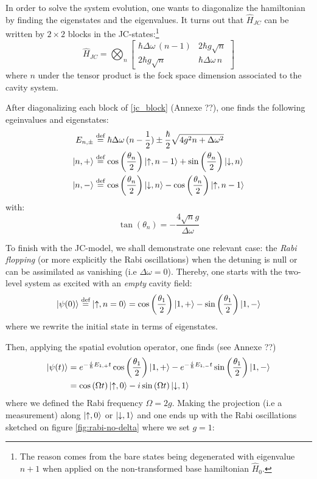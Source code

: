 \documentclass[12pt]{report}
\DeclarePairedDelimiter\ket{\lvert}{\rangle}
\begin{document}
In order to solve the system evolution, one wants to diagonalize the hamiltonian by finding the eigenstates and the eigenvalues. It turns out that $\hat{H}_{JC}$ can be written by $2\times 2$ blocks in the JC-states:\footnote{The reason comes from the bare states being degenerated with eigenvalue $n+1$ when applied on the non-transformed base hamiltonian $\hat{H}_0$.}
\begin{equation}
\label{jc_block}
\hat{H}_{JC} = \bigotimes_n \begin{bmatrix}
\hbar \Delta\omega \, (n-1) & 2\hbar g \sqrt{n}\\
2\hbar g \sqrt{n} & \hbar \Delta\omega \, n
\end{bmatrix}
\end{equation}
where $n$ under the tensor product is the fock space dimension associated to the cavity system.

After diagonalizing each block of \eqref{jc_block} (Annexe ??), one finds the following egeinvalues and eigenstates:
\begin{align}
E_{n, \pm} &\stackrel{\text{def}}{=} \hbar\Delta\omega\,(n-\frac{1}{2}) \pm \frac{\hbar}{2}\sqrt{4g^2n + \Delta\omega ^2}\\
\ket{n, +} &\stackrel{\text{def}}{=} \cos\left(\frac{\theta_n}{2}\right) \ket{\uparrow, n - 1}  + \sin\left(\frac{\theta_n}{2}\right) \ket{\downarrow, n}\\
\ket{n, -} &\stackrel{\text{def}}{=} \cos\left(\frac{\theta_n}{2}\right) \ket{\downarrow, n}  - \cos\left(\frac{\theta_n}{2}\right) \ket{\uparrow, n - 1}
\end{align}
with:
\begin{equation}
\label{tan_theta_n}
\tan\left(\theta_n\right) = -\frac{4\sqrt{n}g}{\Delta\omega}
\end{equation}

To finish with the JC-model, we shall demonstrate one relevant case: the \textit{Rabi flopping} (or more explicitly the Rabi oscillations) when the detuning is null or can be assimilated as vanishing (i.e $\Delta\omega = 0$). Thereby, one starts with the two-level system as excited with an \textit{empty} cavity field:
\begin{equation}
\ket{\psi(0)} \stackrel{\text{def}}{=} \ket{\uparrow, n = 0} = \cos\left(\frac{\theta_{1}}{2}\right) \ket{1, +} - \sin\left(\frac{\theta_{1}}{2}\right) \ket{1, -}
\end{equation}
where we rewrite the initial state in terms of eigenstates.

Then, applying the spatial evolution operator, one finds (see Annexe ??)
\begin{align}
\ket{\psi(t)} &= e^{-\frac{i}{\hbar}E_{1,+}t} \cos\left(\frac{\theta_{1}}{2}\right) \ket{1, +} - e^{-\frac{i}{\hbar}E_{1,-}t} \sin\left(\frac{\theta_{1}}{2}\right) \ket{1, -}\\
&= \cos\left(\Omega t\right) \ket{\uparrow, 0} - i \sin\left(\Omega t\right) \ket{\downarrow, 1}
\end{align}
where we defined the Rabi frequency $\Omega = 2g$. Making the projection (i.e a measurement) along $\ket{\uparrow, 0}$ or $\ket{\downarrow, 1}$ and one ends up with the Rabi oscillations sketched on figure  \ref{fig:rabi-no-delta} where we set $g=1$:
\end{document}
